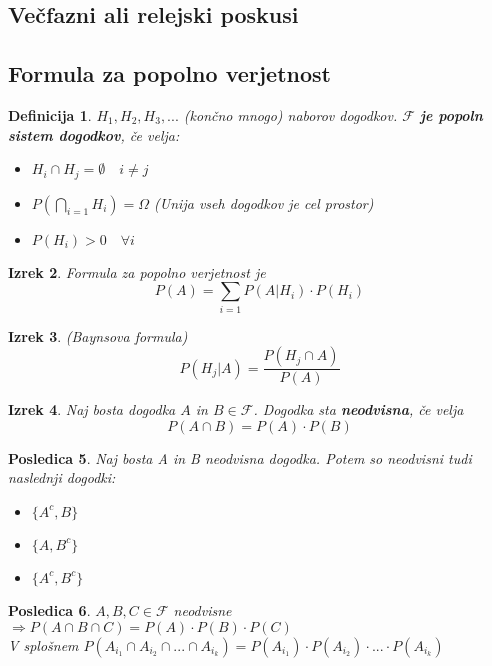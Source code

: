 \documentclass[11pt]{article}
\newtheorem{Izrek}{{\sc Izrek}}[section]
\newtheorem{Posledica}[Izrek]{{\sc Posledica}}
\newtheorem{Definicija}[Izrek]{{\sc Definicija}}
\begin{document}
\subsection{Večfazni ali relejski poskusi}
\subsection{Formula za popolno verjetnost}
\begin{Definicija}
	$H_1,H_2,H_3,...$ (končno mnogo) naborov dogodkov. $\mathcal{F}$ \textbf{je popoln sistem dogodkov}, če velja:
	\begin{itemize}
		\item
		$H_i \cap H_j = \emptyset \quad i \ne j$
		\item
		$ P(\bigcap_{i=1}H_i) = \Omega$ (Unija vseh dogodkov je cel prostor)
		\item
		$P(H_i) > 0 \quad \forall i$	
	\end{itemize}
\end{Definicija}
\begin{Izrek}
	Formula za popolno verjetnost je 
	$$P(A) = \sum_{i = 1}{P(A|H_i) \cdot P(H_i)}$$
\end{Izrek}
\begin{Izrek}(Baynsova formula)
	$$ P(H_j|A) = \frac{P(H_j\cap A)}{P(A)}$$
\end{Izrek}
\begin{Izrek}
	Naj bosta dogodka $A$ in $B \in \mathcal{F}$. Dogodka sta \textbf{neodvisna}, če velja $$P(A\cap B) = P(A) \cdot P(B)$$
\end{Izrek}
\begin{Posledica}
	Naj bosta A in B neodvisna dogodka. Potem so neodvisni tudi naslednji dogodki:
	\begin{itemize}
		\item
		$\{A^c, B\}$
		\item
		$\{A, B^c\}$
		\item
		$\{A^c, B^c\}$
	\end{itemize}
\end{Posledica}
\begin{Posledica}
	$A,B,C \in \mathcal{F}$ neodvisne $ \Rightarrow P(A\cap B \cap C) = P(A) \cdot P(B) \cdot P(C)$
	\\
	V splošnem $P(A_{i_1} \cap A_{i_2} \cap ...\cap A_{i_k}) = P(A_{i_1})\cdot P(A_{i_2}) \cdot ... \cdot P(A_{i_k})$
\end{Posledica}
\end{document}
